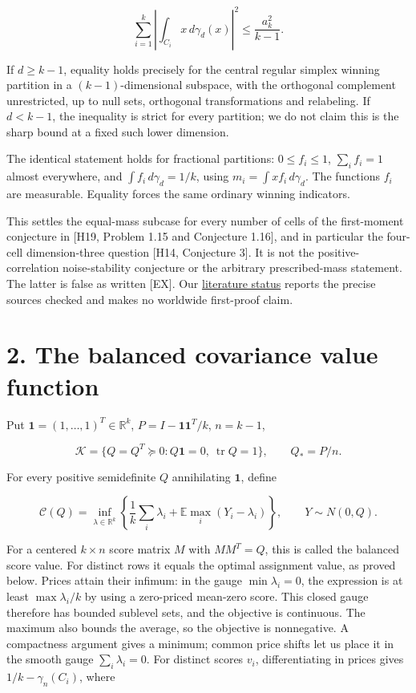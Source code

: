 \documentclass[
  11pt,
]{article}
\begin{document}
\[
 \sum_{i=1}^k\left|\int_{C_i}x\,d\gamma_d(x)\right|^2
             \le\frac{a_k^2}{k-1}.                         \tag{2}
\]

If \(d\ge k-1\), equality holds precisely for the central regular
simplex winning partition in a \((k-1)\)-dimensional subspace, with the
orthogonal complement unrestricted, up to null sets, orthogonal
transformations and relabeling. If \(d<k-1\), the inequality is strict
for every partition; we do not claim this is the sharp bound at a fixed
such lower dimension.

The identical statement holds for fractional partitions:
\(0\le f_i\le1\), \(\sum_i f_i=1\) almost everywhere, and
\(\int f_i\,d\gamma_d=1/k\), using \(m_i=\int xf_i\,d\gamma_d\). The
functions \(f_i\) are measurable. Equality forces the same ordinary
winning indicators.

This settles the equal-mass subcase for every number of cells of the
first-moment conjecture in {[}H19, Problem 1.15 and Conjecture 1.16{]},
and in particular the four-cell dimension-three question {[}H14,
Conjecture 3{]}. It is not the positive-correlation noise-stability
conjecture or the arbitrary prescribed-mass statement. The latter is
false as written {[}EX{]}. Our \href{LITERATURE_STATUS.md}{literature
status} reports the precise sources checked and makes no worldwide
first-proof claim.

\section{2. The balanced covariance value
function}\label{the-balanced-covariance-value-function}

Put \(\mathbf1=(1,\ldots,1)^T\in\mathbb R^k\),
\(P=I-\mathbf1\mathbf1^T/k\), \(n=k-1\),

\[
 \mathcal K=\{Q=Q^T\succeq0:Q\mathbf1=0,\ \operatorname{tr}Q=1\},
 \qquad Q_*=P/n.
\]

For every positive semidefinite \(Q\) annihilating \(\mathbf1\), define

\[
 \mathcal C(Q)=\inf_{\lambda\in\mathbb R^k}
 \left\{\frac1k\sum_i\lambda_i+
               \mathbb E\max_i(Y_i-\lambda_i)\right\},
 \qquad Y\sim N(0,Q).                                      \tag{3}
\]

For a centered \(k\times n\) score matrix \(M\) with \(MM^T=Q\), this is
called the balanced score value. For distinct rows it equals the optimal
assignment value, as proved below. Prices attain their infimum: in the
gauge \(\min\lambda_i=0\), the expression is at least
\(\max\lambda_i/k\) by using a zero-priced mean-zero score. This closed
gauge therefore has bounded sublevel sets, and the objective is
continuous. The maximum also bounds the average, so the objective is
nonnegative. A compactness argument gives a minimum; common price shifts
let us place it in the smooth gauge \(\sum_i\lambda_i=0\). For distinct
scores \(v_i\), differentiating in prices gives \(1/k-\gamma_n(C_i)\),
where
\end{document}
